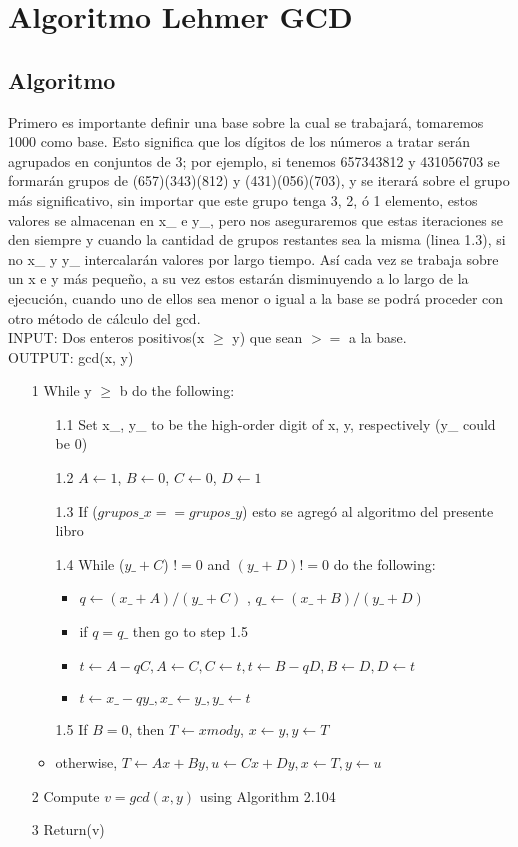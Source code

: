 \chapter{Algoritmo Lehmer GCD}

\section{Algoritmo}
Primero es importante definir una base sobre la cual se trabajará, tomaremos 1000 como base.
Esto significa que los dígitos de los números  a tratar serán agrupados en conjuntos de 3; por ejemplo,
si tenemos 657343812 y 431056703 se formarán grupos de (657)(343)(812) y (431)(056)(703), y se iterará 
sobre el grupo más significativo, sin importar que este grupo tenga 3, 2, ó 1 elemento, estos valores se almacenan en x\_ e y\_, pero nos aseguraremos que estas iteraciones se den siempre y cuando la cantidad de grupos restantes sea la misma (linea 1.3), si no x\_ y y\_ intercalarán valores por largo tiempo.
Así cada vez se trabaja sobre un x e y más pequeño, a su vez estos estarán disminuyendo a lo largo de la ejecución, cuando uno de ellos sea menor o igual a la base se podrá proceder con otro método de cálculo del gcd.\\
INPUT: Dos enteros positivos(x $\geq$ y) que sean $>=$ a la base.\\
OUTPUT: gcd(x, y)\\
\begin{itemize}
 \item[1] While y $\geq$ b do the following:
 \begin{itemize}
  \item[1.1] Set x\_, y\_ to be the high-order digit of x, y, respectively (y\_ could be 0)
  \item[1.2] $A\leftarrow1$, $B\leftarrow0$, $C\leftarrow0$, $D\leftarrow1$ 
  \item[1.3] If ($grupos\_x == grupos\_y$) esto se agregó al algoritmo del presente libro 
  \item[1.4] While ($y\_ + C$) $!= 0$ and $(y\_ + D)!= 0$ do the following:
  \begin{itemize}
   \item $q\leftarrow (x\_ + A)/(y\_ + C)$ , $q\_ \leftarrow (x\_ + B)/(y\_+ D)$ 
   \item if $q = q\_$ then go to step 1.5
   \item $t \leftarrow A-qC, A \leftarrow C, C \leftarrow t, t\leftarrow B - qD, B\leftarrow D, D\leftarrow t$ 
   \item $t\leftarrow x\_ - qy\_, x\_\leftarrow y\_, y\_\leftarrow t$
  \end{itemize}
  \item[1.5] If $B = 0$, then $T \leftarrow x mod y$, $x\leftarrow y, y\leftarrow T$ 
  \item otherwise, $T\leftarrow Ax + By, u\leftarrow Cx + Dy, x\leftarrow T , y\leftarrow u$ \\
 \end{itemize}
 \item[2] Compute $v = gcd(x, y)$ using Algorithm 2.104 
 \item[3] Return(v)
\end{itemize}

